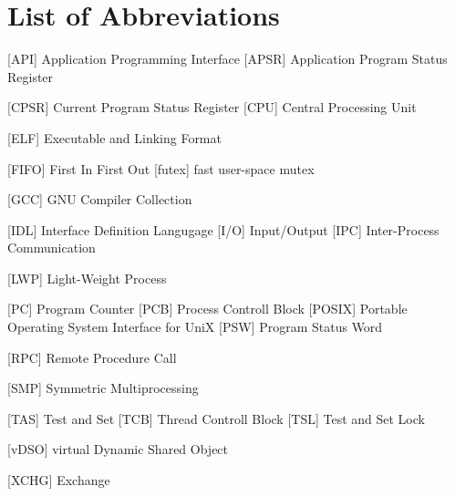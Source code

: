 
\chapter*{List of Abbreviations}

\begin{acronym} [POSIX]
 [API] {Application Programming Interface}
     [APSR] {Application Program Status Register}

 [CPSR] {Current Program Status Register}
 [CPU] {Central Processing Unit}


 [ELF] {Executable and Linking Format}

 [FIFO] {First In First Out}
 [futex] {fast user-space mutex}

 [GCC] {GNU Compiler Collection}


 [IDL] {Interface Definition Langugage}
 [I/O] {Input/Output}
[IPC] {Inter-Process Communication}



 [LWP] {Light-Weight Process}




 [PC] {Program Counter}
 [PCB] {Process Controll Block}
 [POSIX] {Portable Operating System Interface for UniX}
 [PSW] {Program Status Word}


     [RPC] {Remote Procedure Call}

 [SMP] {Symmetric Multiprocessing}

 [TAS] {Test and Set}
 [TCB] {Thread Controll Block}
 [TSL] {Test and Set Lock}


 [vDSO] {virtual Dynamic Shared Object}


 [XCHG] {Exchange}



\end{acronym} 
